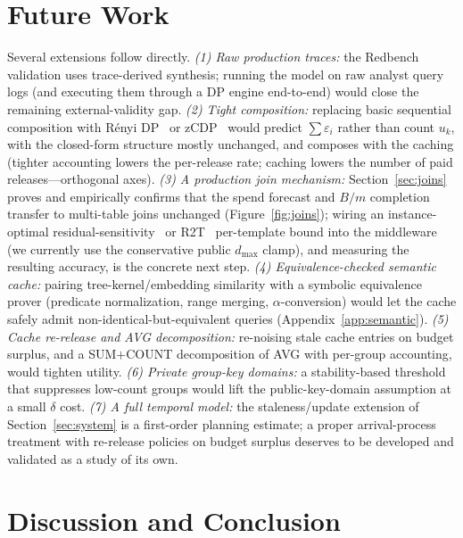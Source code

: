 \documentclass[sigconf,nonacm]{acmart}
\newcommand{\eps}{\varepsilon}
\begin{document}
\section{Future Work}
\label{sec:future}
Several extensions follow directly. \emph{(1) Raw production traces:} the Redbench validation uses trace-derived synthesis; running the model on raw analyst query logs (and executing them through a DP engine end-to-end) would close the remaining external-validity gap. \emph{(2) Tight composition:} replacing basic sequential composition with R\'enyi DP~\cite{mironov2017renyi} or zCDP~\cite{bun2016concentrated} would predict $\sum\eps_i$ rather than count $u_k$, with the closed-form structure mostly unchanged, and composes with the caching (tighter accounting lowers the per-release rate; caching lowers the number of paid releases---orthogonal axes). \emph{(3) A production join mechanism:} Section~\ref{sec:joins} proves and empirically confirms that the spend forecast and $B/m$ completion transfer to multi-table joins unchanged (Figure~\ref{fig:joins}); wiring an instance-optimal residual-sensitivity~\cite{dong2021residual} or R2T~\cite{dong2022r2t} per-template bound into the middleware (we currently use the conservative public $d_{\max}$ clamp), and measuring the resulting accuracy, is the concrete next step. \emph{(4) Equivalence-checked semantic cache:} pairing tree-kernel/embedding similarity with a symbolic equivalence prover (predicate normalization, range merging, $\alpha$-conversion) would let the cache safely admit non-identical-but-equivalent queries (Appendix~\ref{app:semantic}). \emph{(5) Cache re-release and AVG decomposition:} re-noising stale cache entries on budget surplus, and a SUM$+$COUNT decomposition of AVG with per-group accounting, would tighten utility. \emph{(6) Private group-key domains:} a stability-based threshold that suppresses low-count groups would lift the public-key-domain assumption at a small $\delta$ cost. \emph{(7) A full temporal model:} the staleness/update extension of Section~\ref{sec:system} is a first-order planning estimate; a proper arrival-process treatment with re-release policies on budget surplus deserves to be developed and validated as a study of its own.

\section{Discussion and Conclusion}
\label{sec:discussion}
\end{document}
